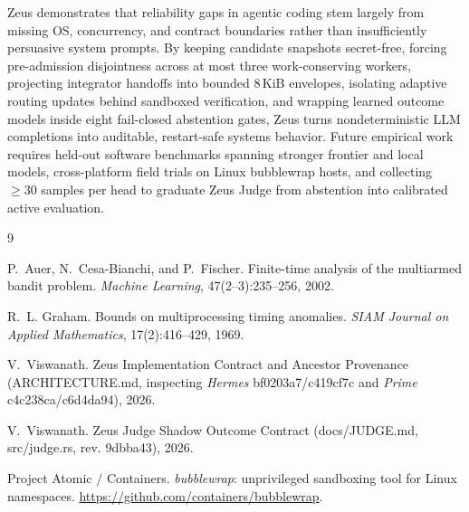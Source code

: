 \documentclass[10pt,letterpaper]{article}
\newcommand{\code}[1]{\textnormal{\small\ttfamily #1}}
\begin{document}
Zeus demonstrates that reliability gaps in agentic coding stem largely from missing OS, concurrency, and contract boundaries rather than insufficiently persuasive system prompts. By keeping candidate snapshots secret-free, forcing pre-admission disjointness across at most three work-conserving workers, projecting integrator handoffs into bounded $8$\,KiB envelopes, isolating adaptive routing updates behind sandboxed verification, and wrapping learned outcome models inside eight fail-closed abstention gates, Zeus turns nondeterministic LLM completions into auditable, restart-safe systems behavior. Future empirical work requires held-out software benchmarks spanning stronger frontier and local models, cross-platform field trials on Linux \code{bubblewrap} hosts, and collecting $\ge 30$ samples per head to graduate Zeus Judge from abstention into calibrated active evaluation.

\begin{thebibliography}{9}

P.~Auer, N.~Cesa-Bianchi, and P.~Fischer.
\newblock Finite-time analysis of the multiarmed bandit problem.
\newblock \emph{Machine Learning}, 47(2--3):235--256, 2002.

R.~L. Graham.
\newblock Bounds on multiprocessing timing anomalies.
\newblock \emph{SIAM Journal on Applied Mathematics}, 17(2):416--429, 1969.

V.~Viswanath.
\newblock Zeus Implementation Contract and Ancestor Provenance (\code{ARCHITECTURE.md}, inspecting \emph{Hermes} \code{bf0203a7}/\code{c419cf7c} and \emph{Prime} \code{c4c238ca}/\code{c6d4da94}), 2026.

V.~Viswanath.
\newblock Zeus Judge Shadow Outcome Contract (\code{docs/JUDGE.md}, \code{src/judge.rs}, rev. \code{9dbba43}), 2026.

Project Atomic / Containers.
\newblock \emph{bubblewrap}: unprivileged sandboxing tool for Linux namespaces.
\newblock \url{https://github.com/containers/bubblewrap}.

\end{thebibliography}
\end{document}

